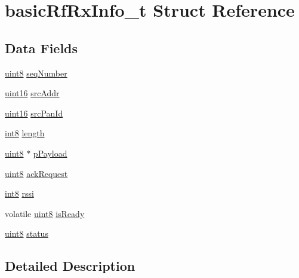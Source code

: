 \hypertarget{structbasic_rf_rx_info__t}{
\section{basicRfRxInfo\_\-t Struct Reference}
\label{structbasic_rf_rx_info__t}
}
\subsection*{Data Fields}
\begin{DoxyCompactItemize}
\item 
\hyperlink{hal__types_8h_adde6aaee8457bee49c2a92621fe22b79}{uint8} \hyperlink{structbasic_rf_rx_info__t_aa5eb7ede96f7f00da24e7b6d4ebe1d0a}{seqNumber}
\item 
\hyperlink{hal__types_8h_a05f6b0ae8f6a6e135b0e290c25fe0e4e}{uint16} \hyperlink{structbasic_rf_rx_info__t_a7cb2225fb2b4dfc645c5c234e609c0e4}{srcAddr}
\item 
\hyperlink{hal__types_8h_a05f6b0ae8f6a6e135b0e290c25fe0e4e}{uint16} \hyperlink{structbasic_rf_rx_info__t_a2ac3ff3aa5255df800d495bf23a131b6}{srcPanId}
\item 
\hyperlink{hal__types_8h_a1b956fe1df85f3c132b21edb4e116458}{int8} \hyperlink{structbasic_rf_rx_info__t_af9266e50356dd007e0b3989e17df1a82}{length}
\item 
\hyperlink{hal__types_8h_adde6aaee8457bee49c2a92621fe22b79}{uint8} $\ast$ \hyperlink{structbasic_rf_rx_info__t_a9461585da66b9bb6d3f2e950b2c6f4dd}{pPayload}
\item 
\hyperlink{hal__types_8h_adde6aaee8457bee49c2a92621fe22b79}{uint8} \hyperlink{structbasic_rf_rx_info__t_a96f75c864979021cdf81ce2085821799}{ackRequest}
\item 
\hyperlink{hal__types_8h_a1b956fe1df85f3c132b21edb4e116458}{int8} \hyperlink{structbasic_rf_rx_info__t_a5a7f445193f8084cf2eb048f36c29d1c}{rssi}
\item 
volatile \hyperlink{hal__types_8h_adde6aaee8457bee49c2a92621fe22b79}{uint8} \hyperlink{structbasic_rf_rx_info__t_a2f4d0721248f73e49bc9e32362b6dcb1}{isReady}
\item 
\hyperlink{hal__types_8h_adde6aaee8457bee49c2a92621fe22b79}{uint8} \hyperlink{structbasic_rf_rx_info__t_a72422b4ffd3c9c466dff6959b3e16885}{status}
\end{DoxyCompactItemize}


\subsection{Detailed Description}


